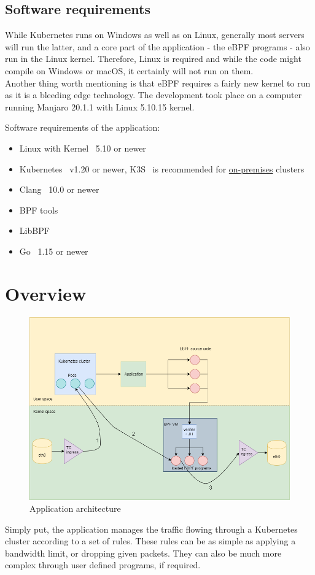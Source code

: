 \newpage
\subsection{Software requirements}
While Kubernetes runs on Windows as well as on Linux, generally most servers will run the latter, and a core part of the application - the eBPF programs - also run in the Linux kernel. Therefore, Linux is required and while the code might compile on Windows or macOS, it certainly will not run on them.\\
Another thing worth mentioning is that eBPF requires a fairly new kernel to run as it is a bleeding edge technology. The development took place on a computer running Manjaro 20.1.1 with Linux 5.10.15 kernel.
\bigbreak

\noindent
Software requirements of the application:
\begin{itemize}
	\item Linux with Kernel~\cite{linux-kernel} 5.10 or newer
	\item Kubernetes~\cite{kubernetes} v1.20 or newer, K3S~\cite{k3s} is recommended for \underline{\gls{on-premises}} clusters
	\item Clang~\cite{clang} 10.0 or newer
	\item BPF tools~\cite{bpf-1}
	\item LibBPF~\cite{libbpf}
	\item Go~\cite{go} 1.15 or newer
\end{itemize}

\newpage
\section{Overview}
\begin{figure}[H]
	\centering
	\includegraphics[width=\textwidth]{images/architecture.png}
	\caption{Application architecture}
	\label{fig:app-arch}
\end{figure}
Simply put, the application manages the traffic flowing through a Kubernetes cluster according to a set of rules. These rules can be as simple as applying a bandwidth limit, or dropping given packets. They can also be much more complex through user defined programs, if required.
\bigbreak

